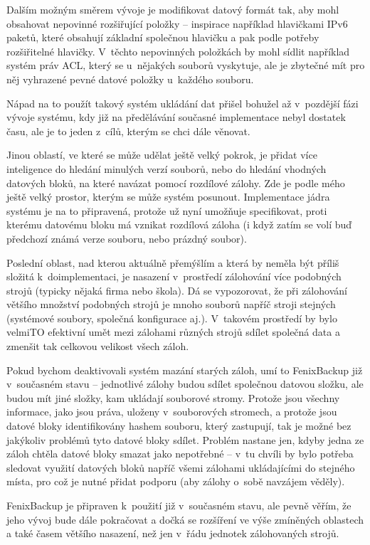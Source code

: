 
Dalším možným směrem vývoje je modifikovat datový formát tak, aby mohl obsahovat
nepovinné rozšiřující položky -- inspirace například hlavičkami IPv6 paketů,
které obsahují základní společnou hlavičku a pak podle potřeby rozšiřitelné
hlavičky. V~těchto nepovinných položkách by mohl sídlit například systém práv
\gls{ACL}, který se u~nějakých souborů vyskytuje, ale je zbytečné mít pro něj
vyhrazené pevné datové položky u~každého souboru.

Nápad na to použít takový systém ukládání dat přišel bohužel až v~pozdější fázi
vývoje systému, kdy již na předělávání současné implementace nebyl dostatek
času, ale je to jeden z~cílů, kterým se chci dále věnovat.

Jinou oblastí, ve které se může udělat ještě velký pokrok, je přidat více
inteligence do hledání minulých verzí souborů, nebo do hledání vhodných datových
bloků, na které navázat pomocí rozdílové zálohy. Zde je podle mého ještě velký
prostor, kterým se může systém posunout. Implementace jádra systému je na to
připravená, protože už nyní umožňuje specifikovat, proti kterému datovému bloku
má vznikat rozdílová záloha (i když zatím se volí buď předchozí známá verze
souboru, nebo prázdný soubor).

Poslední oblast, nad kterou aktuálně přemýšlím a která by neměla být příliš
složitá k~doimplementaci, je nasazení v~prostředí zálohování více podobných
strojů (typicky nějaká firma nebo škola). Dá se vypozorovat, že při zálohování
většího množství podobných strojů je mnoho souborů napříč stroji stejných
(systémové soubory, společná konfigurace aj.). V~takovém prostředí by bylo velmiTO
efektivní umět mezi zálohami různých strojů sdílet společná data a zmenšit tak
celkovou velikost všech záloh.

Pokud bychom deaktivovali systém mazání starých záloh, umí to FenixBackup již
v~současném stavu -- jednotlivé zálohy budou sdílet společnou datovou složku,
ale budou mít jiné složky, kam ukládají souborové stromy. Protože jsou všechny
informace, jako jsou práva, uloženy v~souborových stromech, a protože jsou
datové bloky identifikovány hashem souboru, který zastupují, tak je možné bez
jakýkoliv problémů tyto datové bloky sdílet. Problém nastane jen, kdyby jedna
ze záloh chtěla datové bloky smazat jako nepotřebné -- v~tu chvíli by bylo
potřeba sledovat využití datových bloků napříč všemi zálohami ukládajícími do
stejného místa, pro což je nutné přidat podporu (aby zálohy o~sobě navzájem
věděly).

FenixBackup je připraven k~použití již v~současném stavu, ale pevně věřím,
že jeho vývoj bude dále pokračovat a dočká se rozšíření ve výše zmíněných
oblastech a také časem většího nasazení, než jen v~řádu jednotek zálohovaných
strojů.
